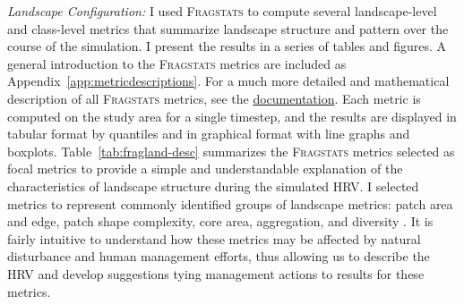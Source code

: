 \emph{Landscape Configuration:} I used \textsc{Fragstats} \citep{Fragstats2012} to compute several landscape-level and class-level metrics that summarize landscape structure and pattern over the course of the simulation. I present the results in a series of tables and figures. A general introduction to  the \textsc{Fragstats} metrics are included as Appendix~\ref{app:metricdescriptions}. For a much more detailed and mathematical description of all \textsc{Fragstats} metrics, see the \href{http://www.umass.edu/landeco/research/fragstats/documents/fragstats.help.4.2.pdf}{documentation}. Each metric is computed on the study area for a single timestep, and the results are displayed in tabular format by quantiles and in graphical format with line graphs and boxplots. Table~\ref{tab:fragland-desc} summarizes the \textsc{Fragstats} metrics selected as focal metrics to provide a simple and understandable explanation of the characteristics of landscape structure during the simulated HRV. I selected metrics to represent commonly identified groups of landscape metrics: patch area and edge, patch shape complexity, core area, aggregation, and diversity \citep{McGarigal2015}. It is fairly intuitive to understand how these metrics may be affected by natural disturbance and human management efforts, thus allowing us to describe the HRV and develop suggestions tying management actions to results for these metrics.



